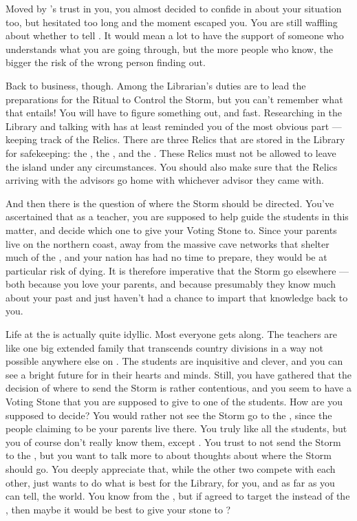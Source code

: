 \documentclass[char]{GL2020}
\begin{document}
Moved by \cChupAvenger{}’s trust in you, you almost decided to confide in \cChupAvenger{\them} about your situation too, but hesitated too long and the moment escaped you. You are still waffling about whether to tell \cChupAvenger{\them}. It would mean a lot to have the support of someone who understands what you are going through, but the more people who know, the bigger the risk of the wrong person finding out.

Back to business, though. Among the Librarian's duties are to lead the preparations for the Ritual to Control the Storm, but you can't remember what that entails! You will have to figure something out, and fast. Researching in the Library and talking with \cInterpol{} has at least reminded you of the most obvious part — keeping track of the Relics. There are three Relics that are stored in the Library for safekeeping: the \iNet{}, the \iLariat{}, and the \iScythe{}. These Relics must not be allowed to leave the island under any circumstances. You should also make sure that the Relics arriving with the advisors go home with whichever advisor they came with. 

And then there is the question of where the Storm should be directed. You've ascertained that as a teacher, you are supposed to help guide the students in this matter, and decide which one to give your Voting Stone to. Since your parents live on the northern coast, away from the massive cave networks that shelter much of the \pTech{}, and your nation has had no time to prepare, they would be at particular risk of dying. It is therefore imperative that the Storm go elsewhere — both because you love your parents, and because presumably they know much about your past and just haven't had a chance to impart that knowledge back to you.

Life at the \pSchool{} is actually quite idyllic. Most everyone gets along. The teachers are like one big extended family that transcends country divisions in a way not possible anywhere else on \pEarth{}. The students are inquisitive and clever, and you can see a bright future for \pEarth{} in their hearts and minds. Still, you have gathered that the decision of where to send the Storm is rather contentious, and you seem to have a Voting Stone that you are supposed to give to one of the students. How are you supposed to decide? You would rather not see the Storm go to the \pTech{}, since the people claiming to be your parents live there. You truly like all the \pTech{} students, but you of course don’t really know them, except \cAmbition{}. You trust \cAmbition{} to not send the Storm to the \pTech{}, but you want to talk more to \cPresident{} about \cPresident{\their} thoughts about where the Storm should go. You deeply appreciate that, while the other two compete with each other, \cPresident{} just wants to do what is best for the Library, for you, and as far as you can tell, the world. You know \cPresident{\theyare} from the \pShip{}, but if \cPresident{} agreed to target the \pFarm{} instead of the \pTech{}, then maybe it would be best to give your stone to \cPresident{\them}?
\end{document}
